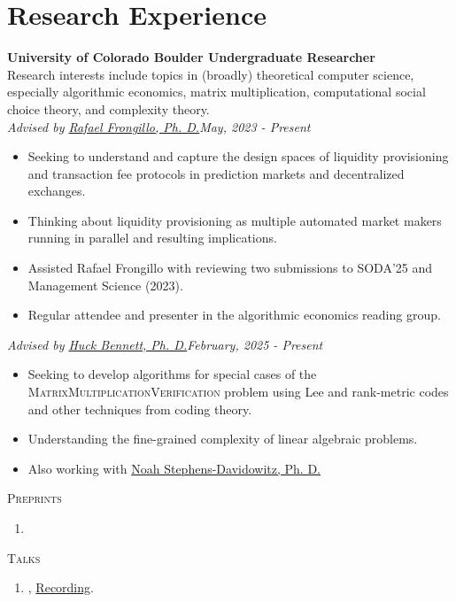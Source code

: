 \documentclass[a4paper,20pt]{article}
\begin{document}
    \section{Research Experience}
    \textbf{University of Colorado Boulder \hfill{Undergraduate Researcher}} \\
    Research interests include topics in (broadly) theoretical computer science, especially algorithmic economics, matrix multiplication, computational social choice theory, and complexity theory.
    \\
    \emph{Advised by \href{https://raf.prof}{Rafael Frongillo, Ph. D.}}\hfill{\textit{May, 2023 - Present}}
    \\
    \begin{itemize}[label=-]
      \vspace{-5pt}
      \item Seeking to understand and capture the design spaces of liquidity provisioning and transaction fee protocols in prediction markets and decentralized exchanges.
      \vspace{-5pt}
      \item Thinking about liquidity provisioning as multiple automated market makers running in parallel and resulting implications.
      \vspace{-5pt}
      \item Assisted Rafael Frongillo with reviewing two submissions to SODA'25 and Management Science (2023).
      \vspace{-5pt}
      \item Regular attendee and presenter in the algorithmic economics reading group.
   \end{itemize}
   \emph{Advised by \href{https://home.cs.colorado.edu/~hbennett/}{Huck Bennett, Ph. D.}}\hfill{\textit{February, 2025 - Present}}
   \\
    \begin{itemize}[label=-]
      \vspace{-5pt}
      \item Seeking to develop algorithms for special cases of the \textsc{MatrixMultiplicationVerification} problem using Lee and rank-metric codes and other techniques from coding theory.
      \item Understanding the fine-grained complexity of linear algebraic problems.
      \vspace{-5pt}
      \item Also working with \href{https://www.noahsd.com}{Noah Stephens-Davidowitz, Ph. D.}
   \end{itemize} 
   \textsc{Preprints}
   \begin{enumerate}
    \item {}
  \end{enumerate}
  \textsc{Talks}
  \begin{enumerate}
    \item {}, \href{https://www.youtube.com/watch?v=JWsXMNSOygA}{Recording}.
  \end{enumerate}
\end{document}
